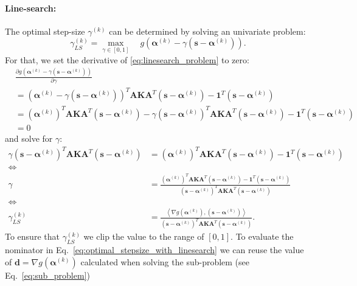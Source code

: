 \documentclass{article}
\newcommand{\balpha}{\boldsymbol{\alpha}}
\newcommand{\bones}{\mathbf{1}}
\begin{document}
\paragraph{Line-search:}
The optimal step-size $\gamma^{(k)}$ can be determined by solving an univariate problem:
\begin{equation}
    \gamma_{LS}^{(k)}=\underset{\gamma\in[0,1]}{\max}\quad g\left(\balpha^{(k)}-\gamma\left(\mathbf{s}-\balpha^{(k)}\right)\right).
    \label{eq:linesearch_problem}
\end{equation}
For that, we set the derivative of \eqref{eq:linesearch_problem} to zero: 
\begin{align}
    &\frac{\partial g\left(\balpha^{(k)}-\gamma\left(\mathbf{s}-\balpha^{(k)}\right)\right)}{\partial\gamma}\\
        &=\left(\balpha^{(k)}-\gamma\left(\mathbf{s}-\balpha^{(k)}\right)\right)^T\mathbf{A}\mathbf{K}\mathbf{A}^T\left(\mathbf{s}-\balpha^{(k)}\right)-\bones^T\left(\mathbf{s}-\balpha^{(k)}\right)\\
        &=\left(\balpha^{(k)}\right)^T\mathbf{A}\mathbf{K}\mathbf{A}^T\left(\mathbf{s}-\balpha^{(k)}\right)
            -\gamma\left(\mathbf{s}-\balpha^{(k)}\right)^T\mathbf{A}\mathbf{K}\mathbf{A}^T\left(\mathbf{s}-\balpha^{(k)}\right)
            -\bones^T\left(\mathbf{s}-\balpha^{(k)}\right)\\
        &=0
\end{align}
and solve for $\gamma$:
\begin{align}
    \gamma\left(\mathbf{s}-\balpha^{(k)}\right)^T\mathbf{A}\mathbf{K}\mathbf{A}^T\left(\mathbf{s}-\balpha^{(k)}\right)
    &=\left(\balpha^{(k)}\right)^T\mathbf{A}\mathbf{K}\mathbf{A}^T\left(\mathbf{s}-\balpha^{(k)}\right)
            -\bones^T\left(\mathbf{s}-\balpha^{(k)}\right)\\
    \Leftrightarrow\\
    \gamma&=\frac{\left(\balpha^{(k)}\right)^T\mathbf{A}\mathbf{K}\mathbf{A}^T\left(\mathbf{s}-\balpha^{(k)}\right)
            -\bones^T\left(\mathbf{s}-\balpha^{(k)}\right)}{\left(\mathbf{s}-\balpha^{(k)}\right)^T\mathbf{A}\mathbf{K}\mathbf{A}^T\left(\mathbf{s}-\balpha^{(k)}\right)}\\
    \Leftrightarrow\\
    \gamma_{LS}^{(k)}&=\frac{\left\langle\nabla g\left(\balpha^{(k)}\right),\left(\mathbf{s}-\balpha^{(k)}\right)\right\rangle}{\left(\mathbf{s}-\balpha^{(k)}\right)^T\mathbf{A}\mathbf{K}\mathbf{A}^T\left(\mathbf{s}-\balpha^{(k)}\right)}\label{eq:optimal_stepsize_with_linesearch}.
\end{align}
To ensure that $\gamma_{LS}^{(k)}$ we clip the value to the range of $[0,1]$. To evaluate the nominator in Eq.~\eqref{eq:optimal_stepsize_with_linesearch} we can reuse the value of $\mathbf{d}=\nabla g\left(\balpha^{(k)}\right)$ calculated when solving the sub-problem (see Eq.~\eqref{eq:sub_problem})
\end{document}
